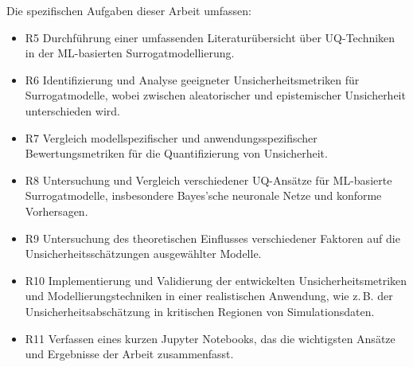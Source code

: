 Die spezifischen Aufgaben dieser Arbeit umfassen:

\begin{itemize}
  \item {R5} Durchführung einer umfassenden Literaturübersicht über UQ-Techniken in der ML-basierten Surrogatmodellierung.
  \item {R6} Identifizierung und Analyse geeigneter Unsicherheitsmetriken für Surrogatmodelle, wobei zwischen aleatorischer und epistemischer Unsicherheit unterschieden wird.
  \item {R7} Vergleich modellspezifischer und anwendungsspezifischer Bewertungsmetriken für die Quantifizierung von Unsicherheit.
  \item {R8} Untersuchung und Vergleich verschiedener UQ-Ansätze für ML-basierte Surrogatmodelle, insbesondere Bayes'sche neuronale Netze und konforme Vorhersagen.
  \item {R9} Untersuchung des theoretischen Einflusses verschiedener Faktoren auf die Unsicherheitsschätzungen ausgewählter Modelle.
  \item {R10} Implementierung und Validierung der entwickelten Unsicherheitsmetriken und Modellierungstechniken in einer realistischen Anwendung, wie z.\,B. der Unsicherheitsabschätzung in kritischen Regionen von Simulationsdaten.
  \item {R11} Verfassen eines kurzen Jupyter Notebooks, das die wichtigsten Ansätze und Ergebnisse der Arbeit zusammenfasst.
\end{itemize}







